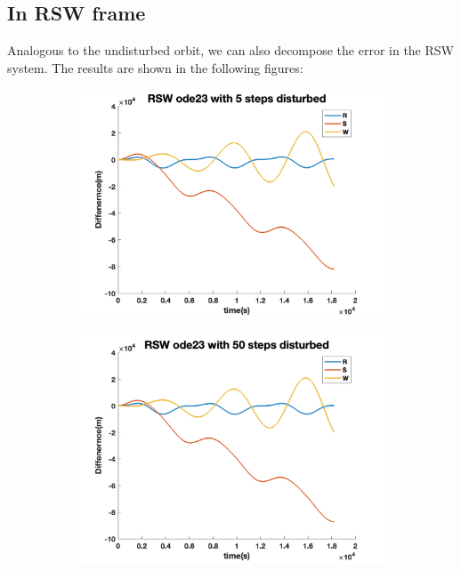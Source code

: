 \documentclass[12pt
,headinclude
,headsepline
,bibtotocnumbered
]{scrartcl}
\begin{document}
    \subsection*{In RSW frame}
    Analogous to the undisturbed orbit, we can also decompose the error in the RSW system. The results are shown in the following figures:
    \begin{figure}[H]
        \centering
        \begin{subfigure}[b]{0.45\textwidth}
        \includegraphics[width=1\textwidth]{./plots/ode23_5_yprime_d_RSW.png}
        \end{subfigure}
        \begin{subfigure}[b]{0.45\textwidth}
        \includegraphics[width=1\textwidth]{./plots/ode23_50_yprime_d_RSW.png}

\end{subfigure}
\end{figure}
\end{document}
